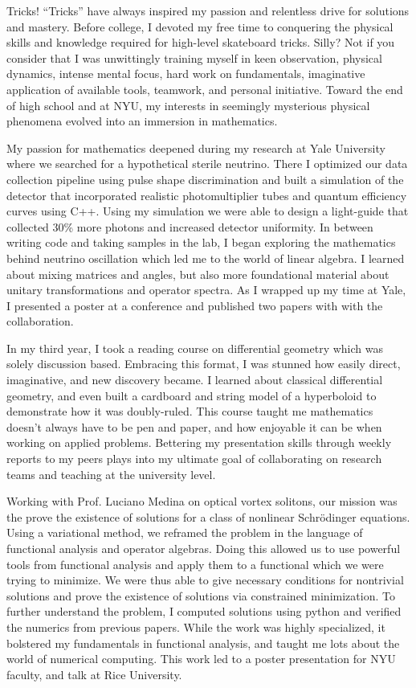 \documentclass[11pt]{article}
\begin{document}
Tricks! ``Tricks'' have always inspired my passion and relentless drive for solutions and mastery. Before college, I devoted my free time to conquering the physical skills and knowledge required for high-level skateboard tricks. Silly? Not if you consider that I was unwittingly training myself in keen observation, physical dynamics, intense mental focus, hard work on fundamentals, imaginative application of available tools, teamwork, and personal initiative. Toward the end of high school and at NYU, my interests in seemingly mysterious physical phenomena evolved into an immersion in mathematics.

My passion for mathematics deepened during my research at Yale University where we searched for a hypothetical sterile neutrino. There I optimized our data collection pipeline using pulse shape discrimination and built a simulation of the detector that incorporated realistic photomultiplier tubes and quantum efficiency curves using C++. Using my simulation we were able to design a light-guide that collected 30\% more photons and increased detector uniformity. In between writing code and taking samples in the lab, I began exploring the mathematics behind neutrino oscillation which led me to the world of linear algebra. I learned about mixing matrices and angles, but also more foundational material about unitary transformations and operator spectra. As I wrapped up my time at Yale, I presented a poster at a conference and published two papers with with the collaboration.

In my third year, I took a reading course on differential geometry which was solely discussion based. Embracing this format, I was stunned how easily direct, imaginative, and new discovery became. I learned about classical differential geometry, and even built a cardboard and string model of a hyperboloid to demonstrate how it was doubly-ruled. This course taught me mathematics doesn't always have to be pen and paper, and how enjoyable it can be when working on applied problems. Bettering my presentation skills through weekly reports to my peers plays into my ultimate goal of collaborating on research teams and teaching at the university level.

Working with Prof. Luciano Medina on optical vortex solitons, our mission was the prove the existence of solutions for a class of nonlinear Schr\"{o}dinger equations. Using a variational method, we reframed the problem in the language of functional analysis and operator algebras. Doing this allowed us to use powerful tools from functional analysis and apply them to a functional which we were trying to minimize. We were thus able to give necessary conditions for nontrivial solutions and prove the existence of solutions via constrained minimization. To further understand the problem, I computed solutions using python and verified the numerics from previous papers. While the work was highly specialized, it bolstered my fundamentals in functional analysis, and taught me lots about the world of numerical computing. This work led to a poster presentation for NYU faculty, and talk at Rice University.
\end{document}
